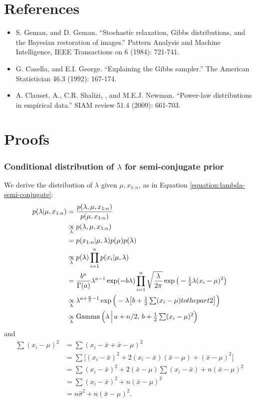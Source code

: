 \documentclass[12pt]{article}
\begin{document}
\section*{References}
\begin{itemize}
    \item S. Geman, and D. Geman. ``Stochastic relaxation, Gibbs distributions, and the Bayesian restoration of images.'' Pattern Analysis and Machine Intelligence, IEEE Transactions on 6 (1984): 721-741.
    \item G. Casella, and E.I. George. ``Explaining the Gibbs sampler.'' The American Statistician 46.3 (1992): 167-174.
    \item A. Clauset, A., C.R. Shalizi, , and M.E.J. Newman. ``Power-law distributions in empirical data.'' SIAM review 51.4 (2009): 661-703.
\end{itemize}



\appendix

\section*{Proofs}

\subsubsection*{Conditional distribution of $\lambda$ for semi-conjugate prior}
We derive the distribution of $\lambda$ given $\mu, x_{1:n}$, as in Equation \ref{equation:lambda-semi-conjugate}:
\begin{align*}
p(\lambda|\mu,x_{1:n}) & =\frac{p(\lambda,\mu,x_{1:n})}{p(\mu,x_{1:n})}\\
&\underset{\lambda}{\propto} p(\lambda,\mu, x_{1:n})\\
& = p(x_{1:n}|\mu,\lambda) p(\mu) p(\lambda)\\
&\underset{\lambda}{\propto} p(\lambda)\prod_{i = 1}^n p(x_i|\mu,\lambda)\\
&=\frac{b^a}{\Gamma(a)}\lambda^{a-1}\exp(-b\lambda)
\prod_{i = 1}^n \sqrt{\frac{\lambda}{2\pi}}\exp\big(-\tfrac{1}{2}\lambda (x_i -\mu)^2\big)\\
&\underset{\lambda}{\propto} \lambda^{a +\frac{n}{2}-1}
\exp\Big(-\lambda\big[b +\tfrac{1}{2}\textstyle\sum (x_i -\mu) to the part 2\big]\Big)\\
&\underset{\lambda}{\propto}\operatorname*{Gamma}\Big(\lambda\,\Big\vert\, a + n/2,\, b +\tfrac{1}{2}\textstyle\sum (x_i -\mu)^2\Big)
\end{align*}
and
\begin{align*}
\textstyle\sum (x_i -\mu)^2 & = \textstyle\sum (x_i-\bar x+ \bar x -\mu)^2\\
& = \textstyle\sum \Big[(x_i-\bar x)^2+  2(x_i -\bar x)(\bar x -\mu) + (\bar x -\mu)^2\Big]\\
& = \textstyle\sum(x_i-\bar x)^2 + 2(\bar x -\mu)\sum(x_i -\bar x) + n(\bar x -\mu)^2\\
& = \textstyle\sum(x_i-\bar x)^2 + n(\bar x -\mu)^2\\
& = n\hat\sigma^2 + n(\bar x -\mu)^2.
\end{align*}
\end{document}
